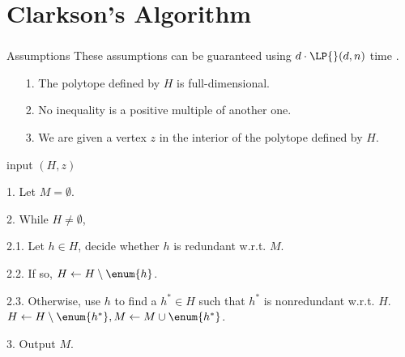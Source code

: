\section{Clarkson's Algorithm}
\begin{frame}\frametitle{\insertsection}\justifying
\begin{ebox}{Assumptions}
These assumptions can be guaranteed using \(d\cdot\LP{}(d,n)\) time
\cite{fukuda:2015}.
\begin{itemize}
\item[{\color{SpringGreen4}1.}] The polytope defined by \(H\) is full-dimensional.
\item[{\color{SpringGreen4}2.}] No inequality is a positive multiple of another one.
\item[{\color{SpringGreen4}3.}] We are given a vertex \(z\) in the interior of the polytope defined by \(H\).
\end{itemize}
\end{ebox}
\pause
\begin{algo}
\item[input] \((H, z)\)
\item[1.] Let \(M = \emptyset\).
\item[2.] While \(H \neq \emptyset\),
\item[2.1.] Let \(h \in H\), decide whether \(h\) is redundant w.r.t. \(M\).
\item[2.2.] If so, \(H \gets H \setminus \enum{h}\).
\item[2.3.] Otherwise, use \(h\) to find a \(h^* \in H\) such that \(h^*\) is
nonredundant w.r.t. \(H\). \(H \gets H \setminus \enum{h^*}, M
\gets M \cup \enum{h^*}\).
\item[3.] Output \(M\).
\end{algo}
\end{frame}

